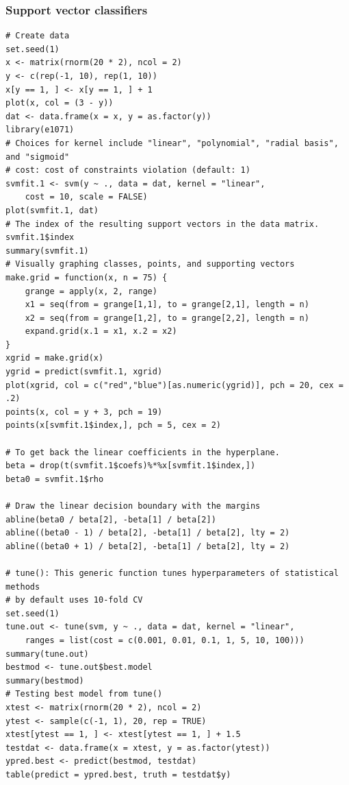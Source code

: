 \documentclass[11pt]{article}
\begin{document}
\subsubsection{Support vector classifiers}
\begin{lstlisting}
# Create data
set.seed(1)
x <- matrix(rnorm(20 * 2), ncol = 2)
y <- c(rep(-1, 10), rep(1, 10))
x[y == 1, ] <- x[y == 1, ] + 1
plot(x, col = (3 - y))
dat <- data.frame(x = x, y = as.factor(y))
library(e1071)
# Choices for kernel include "linear", "polynomial", "radial basis", and "sigmoid"
# cost: cost of constraints violation (default: 1)
svmfit.1 <- svm(y ~ ., data = dat, kernel = "linear", 
    cost = 10, scale = FALSE)
plot(svmfit.1, dat)
# The index of the resulting support vectors in the data matrix.
svmfit.1$index
summary(svmfit.1)
# Visually graphing classes, points, and supporting vectors
make.grid = function(x, n = 75) {
    grange = apply(x, 2, range)
    x1 = seq(from = grange[1,1], to = grange[2,1], length = n)
    x2 = seq(from = grange[1,2], to = grange[2,2], length = n)
    expand.grid(x.1 = x1, x.2 = x2)
}
xgrid = make.grid(x)
ygrid = predict(svmfit.1, xgrid)
plot(xgrid, col = c("red","blue")[as.numeric(ygrid)], pch = 20, cex = .2)
points(x, col = y + 3, pch = 19)
points(x[svmfit.1$index,], pch = 5, cex = 2)

# To get back the linear coefficients in the hyperplane.
beta = drop(t(svmfit.1$coefs)%*%x[svmfit.1$index,])
beta0 = svmfit.1$rho

# Draw the linear decision boundary with the margins
abline(beta0 / beta[2], -beta[1] / beta[2])
abline((beta0 - 1) / beta[2], -beta[1] / beta[2], lty = 2)
abline((beta0 + 1) / beta[2], -beta[1] / beta[2], lty = 2)

# tune(): This generic function tunes hyperparameters of statistical methods 
# by default uses 10-fold CV
set.seed(1)
tune.out <- tune(svm, y ~ ., data = dat, kernel = "linear", 
    ranges = list(cost = c(0.001, 0.01, 0.1, 1, 5, 10, 100)))
summary(tune.out)
bestmod <- tune.out$best.model
summary(bestmod)
# Testing best model from tune()
xtest <- matrix(rnorm(20 * 2), ncol = 2)
ytest <- sample(c(-1, 1), 20, rep = TRUE)
xtest[ytest == 1, ] <- xtest[ytest == 1, ] + 1.5
testdat <- data.frame(x = xtest, y = as.factor(ytest))
ypred.best <- predict(bestmod, testdat)
table(predict = ypred.best, truth = testdat$y)
\end{lstlisting}
\end{document}
